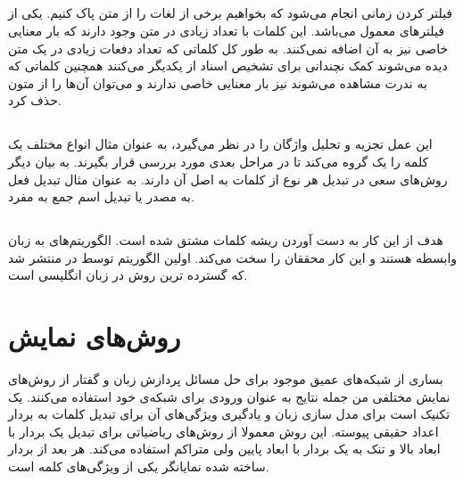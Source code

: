 \documentclass[12pt, a4paper, oneside]{report}
\begin{document}
\subsection{}

فیلتر کردن زمانی انجام می‌شود که بخواهیم برخی از لغات را از متن پاک کنیم. یکی از فیلتر‌های معمول
می‌باشد. این کلمات با تعداد زیادی در متن وجود دارند که بار معنایی خاصی نیز به آن اضافه نمی‌کنند.
به طور کل کلماتی که تعداد دفعات زیادی در یک متن دیده می‌شوند کمک نچندانی برای تشخیص اسناد از یکدیگر می‌کنند
همچنین کلماتی که به ندرت مشاهده می‌شوند نیز بار معنایی خاصی ندارند و می‌توان آن‌ها را از متون حذف کرد\cite{DBLP:journals/corr/AllahyariPASTGK17a}.

\subsection{}

این عمل تجزیه و تحلیل واژگان را در نظر می‌گیرد، به عنوان مثال انواع مختلف یک کلمه را یک گروه می‌کند تا در مراحل بعدی
مورد بررسی قرار بگیرند. به بیان دیگر روش‌های
سعی در تبدیل هر نوع از کلمات به اصل آن دارند. به عنوان مثال تبدیل فعل به مصدر یا تبدیل اسم جمع به مفرد\cite{DBLP:journals/corr/AllahyariPASTGK17a}.

\subsection{}

هدف از این کار به دست آوردن ریشه کلمات مشتق شده است. الگوریتم‌های
به زبان وابسطه هستند و این کار محققان را سخت می‌کند. اولین الگوریتم
توسط
در
\cite{porter1980algorithm}
منتشر شد که گسترده ترین روش در زبان انگلیسی است\cite{DBLP:journals/corr/AllahyariPASTGK17a}.


\section{روش‌های نمایش}

بساری از شبکه‌های عمیق موجود برای حل مسائل پردازش زبان و گفتار از روش‌های نمایش مختلفی من جمله نتایج
به عنوان ورودی برای شبکه‌ی خود استفاده می‌کنند.
یک تکنیک است برای مدل سازی زبان و یادگیری ویژگی‌های آن برای تبدیل کلمات به بردار اعداد حقیقی پیوسته.
این روش معمولا از روش‌های ریاضیاتی برای تبدیل یک بردار با ابعاد بالا و تنک به یک بردار با ابعاد پایین ولی متراکم استفاده می‌کند.
هر بعد از بردار ساخته شده نمایانگر یکی از ویژگی‌های کلمه است.
\end{document}
